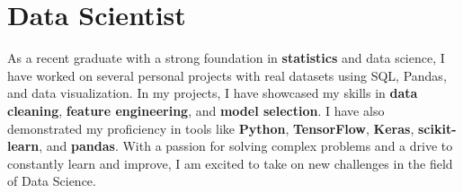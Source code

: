 
\section{Data Scientist}
\small{
    As a recent graduate with a strong foundation in \textbf{statistics} and data science, I have worked on several personal projects with real datasets using SQL, Pandas, and data visualization. In my projects, I have showcased my skills in \textbf{data cleaning}, \textbf{feature engineering}, and \textbf{model selection}. I have also demonstrated my proficiency in tools like \textbf{Python}, \textbf{TensorFlow}, \textbf{Keras}, \textbf{scikit-learn}, and \textbf{pandas}. With a passion for solving complex problems and a drive to constantly learn and improve, I am excited to take on new challenges in the field of Data Science.
}